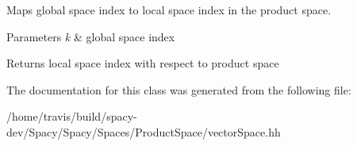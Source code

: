 \-Maps global space index to local space index in the product space. 


\begin{DoxyParams}{\-Parameters}
{\em k} & global space index \\
\hline
\end{DoxyParams}
\begin{DoxyReturn}{\-Returns}
local space index with respect to product space 
\end{DoxyReturn}


\-The documentation for this class was generated from the following file\-:\begin{DoxyCompactItemize}
\item 
/home/travis/build/spacy-\/dev/\-Spacy/\-Spacy/\-Spaces/\-Product\-Space/vector\-Space.\-hh\end{DoxyCompactItemize}
